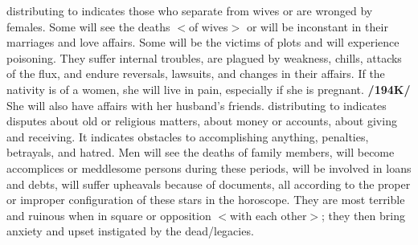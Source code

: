 \Saturn\xspace distributing to \Venus\xspace indicates those who separate from wives or are wronged by females. Some will see the deaths $<$of wives$>$ or will be inconstant in their marriages and love affairs. Some will be the victims of plots and will experience poisoning. They suffer internal troubles, are plagued by weakness, chills, attacks of the flux, and endure reversals, lawsuits, and changes in their affairs. If the nativity is of a women, she will live in pain, especially if she is pregnant. \textbf{/194K/} She will also have affairs with her husband’s friends.
\enlargethispage{2\baselineskip}
\Saturn\xspace distributing to \Mercury\xspace indicates disputes about old or religious matters, about money or
accounts, about giving and receiving. It indicates obstacles to accomplishing anything, penalties, betrayals, and hatred. Men will see the deaths of family members, will become accomplices or meddlesome persons during these periods, will be involved in loans and debts, will suffer upheavals because of documents, all according to the proper or improper configuration of these stars in the horoscope. They are most terrible and ruinous when in square or opposition $<$with each other$>$; they then bring anxiety and upset instigated by the dead/legacies.

\newpage